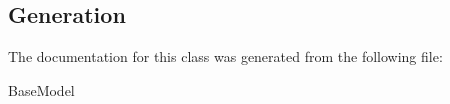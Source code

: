 \subsection{Generation}
The documentation for this class was generated from the following file\-:
\begin{DoxyCompactItemize}
\item BaseModel
\end{DoxyCompactItemize} 









